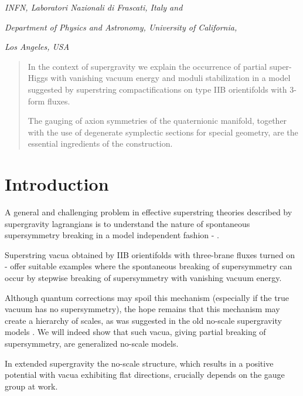 \documentclass[a4paper,12pt]{article}
\begin{document}
\bigskip



\centerline{\myHighlight{$^\star$}\coordHE{} \it INFN, Laboratori
Nazionali di
Frascati, Italy and}
\centerline{\it Department of Physics and Astronomy, University of
California,} \centerline{\it  Los Angeles, USA} 






\vskip 3cm

\begin{abstract}
In the context of \coordHE{} supergravity we explain the occurrence of partial super-Higgs with vanishing vacuum energy and
moduli stabilization  in a model suggested by superstring compactifications on type IIB orientifolds with 3-form fluxes.

The gauging of axion symmetries of the quaternionic manifold, together with the use of degenerate symplectic sections
for special geometry, are the essential ingredients of the construction.

\end{abstract}


 \vfill\eject


\section{Introduction}

A general and challenging problem in effective superstring theories described by supergravity lagrangians is to 
understand the nature of spontaneous supersymmetry breaking in a model independent fashion \cite{ps} - \cite{adfl1}.

Superstring vacua obtained by IIB orientifolds with three-brane fluxes turned on \cite{drs} - \cite{fm}
 offer suitable examples where the spontaneous
breaking of \coordHE{} supersymmetry can occur by stepwise breaking of supersymmetry \coordHE{} 
with vanishing vacuum energy.

Although quantum corrections may spoil this mechanism \cite{bbhl} (especially if the true vacuum has no supersymmetry), 
the hope remains that this mechanism may create a hierarchy of scales, as was suggested in the old no-scale supergravity models
 \cite{cfkn,elnt}.
We will indeed show that such vacua, giving partial breaking of supersymmetry, are generalized no-scale models.

In extended supergravity the no-scale structure, which results in a positive potential with vacua exhibiting flat directions,
crucially depends on the gauge group at work.
\end{document}
